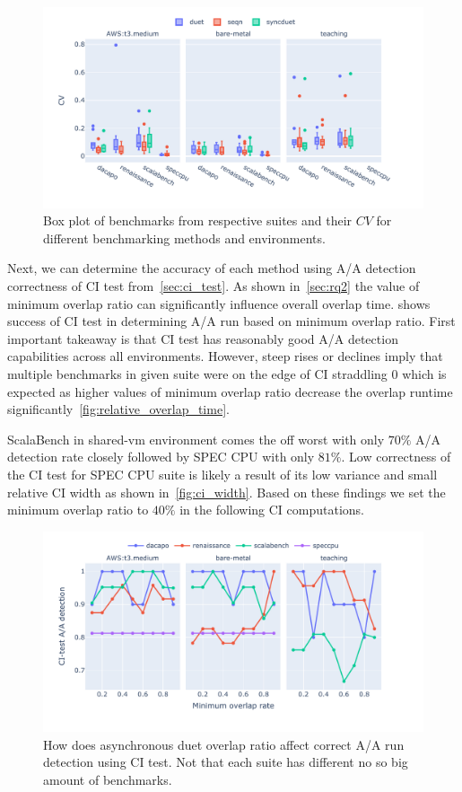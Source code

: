 \begin{figure}
	\centering
	\includegraphics[width=1\linewidth]{./figures/cv.pdf}
	\caption{
		Box plot of benchmarks from respective suites and their $CV$ for different benchmarking methods and environments.
	}
	\label{fig:cv}
\end{figure}

Next, we can determine the accuracy of each method using A/A detection correctness of CI test from~\cref{sec:ci_test}.
As shown in~\cref{sec:rq2} the value of minimum overlap ratio can significantly influence overall overlap time.
 shows success of CI test in determining A/A run based on minimum overlap ratio.
First important takeaway is that CI test has reasonably good A/A detection capabilities across all environments.
However, steep rises or declines imply that multiple benchmarks in given suite were on the edge of CI straddling $0$ which is expected as higher values of minimum overlap ratio decrease the overlap runtime significantly~\ref{fig:relative_overlap_time}.

ScalaBench in shared-vm environment comes the off worst with only $70\%$ A/A detection rate closely followed by SPEC CPU with only $81\%$.
Low correctness of the CI test for SPEC CPU suite is likely a result of its low variance and small relative CI width as shown in~\cref{fig:ci_width}.
Based on these findings we set the minimum overlap ratio to $40\%$ in the following CI computations.

\begin{figure}
	\centering
	\includegraphics[width=1\linewidth]{./figures/citest_aa_match_by_overlap.pdf}
	\caption{
		How does asynchronous duet overlap ratio affect correct A/A run detection using CI test.
		Not that each suite has different no so big amount of benchmarks.
	}
	\label{fig:citest_overlap_aa}
\end{figure}

